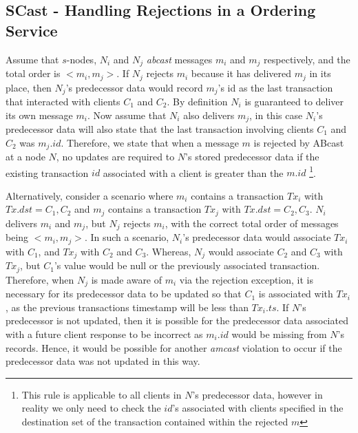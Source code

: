     \subsection{SCast - Handling Rejections in a Ordering Service}
    Assume that $s$-nodes, $N_i$ and $N_j$ \emph{abcast} messages $m_i$ and $m_j$ respectively, and the total order is $<m_i, m_j>$.  If $N_j$ rejects $m_i$ because it has delivered $m_j$ in its place, then $N_j$'s predecessor data would record $m_j$'s id as the last transaction that interacted with clients $C_1$ and $C_2$.  By definition $N_i$ is guaranteed to deliver its own message $m_i$.  Now assume that $N_i$ also delivers $m_j$, in this case $N_i$'s predecessor data will also state that the last transaction involving clients $C_1$ and $C_2$ was $m_j.id$.  Therefore, we state that when a message $m$ is rejected by \textsf{ABcast} at a node $N$, no updates are required to $N$'s stored predecessor data if the existing transaction $id$ associated with a client is greater than the $m.id$ \footnote{This rule is applicable to all clients in $N$'s predecessor data, however in reality we only need to check the $id$'s associated with clients specified in the destination set of the transaction contained within the rejected $m$}.  

    Alternatively, consider a scenario where $m_i$ contains a transaction $Tx_i$ with $Tx.dst = {C_1, C_2}$ and $m_j$ contains a transaction $Tx_j$ with $Tx.dst = {C_2, C_3}$.  $N_i$ delivers $m_i$ and $m_j$, but $N_j$ rejects $m_i$, with the correct total order of messages being $<m_i, m_j>$.  In such a scenario, $N_i$'s predecessor data would associate $Tx_i$ with $C_1$, and $Tx_j$ with $C_2$ and $C_3$.  Whereas, $N_j$ would associate $C_2$ and $C_3$ with $Tx_j$, but $C_1$'s value would be null or the previously associated transaction.  Therefore, when $N_j$ is made aware of $m_i$ via the rejection exception, it is necessary for its predecessor data to be updated so that $C_1$ is associated with $Tx_i$, as the previous transactions timestamp will be less than $Tx_i.ts$.  If $N$'s predecessor is not updated, then it is possible for the predecessor data associated with a future client response to be incorrect as $m_i.id$ would be missing from $N$'s records.  Hence, it would be possible for another \emph{amcast} violation to occur if the predecessor data was not updated in this way.  
        
